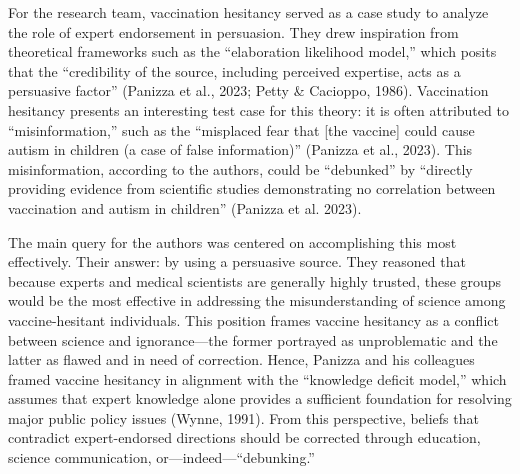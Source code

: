 \documentclass[authordate, empirical]{jote-new-article}
\begin{document}
	For the research team, vaccination hesitancy served as a case study to analyze the role of expert endorsement in persuasion. They drew inspiration from theoretical frameworks such as the “elaboration likelihood model,” which posits that the “credibility of the source, including perceived expertise, acts as a persuasive factor” (Panizza et al., 2023; Petty \& Cacioppo, 1986). Vaccination hesitancy presents an interesting test case for this theory: it is often attributed to “misinformation,” such as the “misplaced fear that [the vaccine] could cause autism in children (a case of false information)” (Panizza et al., 2023). This misinformation, according to the authors, could be “debunked” by “directly providing evidence from scientific studies demonstrating no correlation between vaccination and autism in children” (Panizza et al. 2023).







	The main query for the authors was centered on accomplishing this most effectively. Their answer: by using a persuasive source. They reasoned that because experts and medical scientists are generally highly trusted, these groups would be the most effective in addressing the misunderstanding of science among vaccine-hesitant individuals. This position frames vaccine hesitancy as a conflict between science and ignorance—the former portrayed as unproblematic and the latter as flawed and in need of correction. Hence, Panizza and his colleagues framed vaccine hesitancy in alignment with the “knowledge deficit model,” which assumes that expert knowledge alone provides a sufficient foundation for resolving major public policy issues (Wynne, 1991). From this perspective, beliefs that contradict expert-endorsed directions should be corrected through education, science communication, or—indeed—“debunking.”
\end{document}
